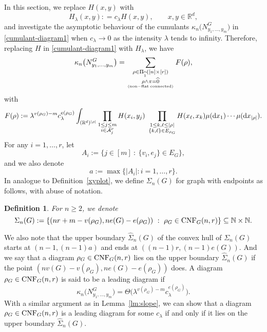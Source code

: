 \documentclass[12pt]{article}
\newcommand{\R}{\mathbb{R}}
\newcommand{\inte}{\mathbb{N}}
\newtheorem{definition}[prop]{Definition}
\def\real{{\mathord{\mathbb R}}}
\numberwithin{equation}{section}
\begin{document}
 In this section, we replace $H(x,y)$ with
$$
H_\lambda (x,y) : = c_\lambda H(x,y),
\qquad x, y \in \real^d,
$$
and investigate the asymptotic behaviour of the cumulants
$\kappa_n\big(N_{y_1,\ldots , y_m}^G\big)$ in \eqref{cumulant-diagram1} when $c_\lambda\to0$ as the intensity $\lambda$ tends
to infinity. Therefore, replacing $H$ in \eqref{cumulant-diagram1} with $H_\lambda$, we have
\begin{equation}\label{cumulant-diagram2}
  \kappa_n\big(N_{y_1,\ldots , y_m}^G\big)=
        \sum_{\substack{\rho\in\Pi_{\widehat{1}} ([n]\times[r])
            \\\rho\wedge\pi=\widehat{0}} \atop {\rm (non-flat \ \! connected)}}F(\rho),
\end{equation}
with 
\begin{equation}\label{}
  F(\rho):=\lambda^{v(\rho_G)-m}c_\lambda^{e(\rho_G)}
  \int_{(\R^d)^{|\rho|}}\prod_{
    \substack{%
    1 \leq j \leq m
      \\
    i\in {\cal A}^\rho_j}}  H(x_i,y_j)
  \ \prod_{\substack{
      1\leq k , \ell \le|\rho|
      \\
      \{ k , \ell \}\in E_{\rho_G} }}H(x_\ell,x_k)\mu ( \mathrm{d}x_1)
  \cdots \mu ( \mathrm{d}x_{|\rho|} ).
\end{equation}
For any $i=1, \ldots ,r$, let 
\begin{equation}\label{neighborhood1}
  A_i :=\{j\in [m] \ : \ \{v_i,e_j\}\in E_G\},
\end{equation}
and we also denote 
\begin{equation}
  a:=\max\{|A_i|:i=1,\dots,r\}.
\end{equation}
In analogue to Definition~\ref{xyplot}, we define $\Sigma_n(G)$ for graph with endpoints as follows, with abuse of notation. 
\begin{definition}\label{xyplot2}
  For $n\ge2$, we denote 
  \begin{equation*}
        \Sigma_n(G):=\{(nr+m-v(\rho_G),ne(G)-e(\rho_G)) \ : \ \rho_G\in
            {\rm CNF}_G(n,r)
            \} \subseteq \inte\times \inte.
    \end{equation*}
\end{definition}
We also note that the upper boundary $\widehat{\Sigma}_n(G)$ of the convex hull of $\Sigma_n(G)$ starts at $(n-1,(n-1)a)$ and ends at $((n-1)r,(n-1)e(G))$. And we say that a diagram $\rho_G\in {\rm CNF}_G(n,r)$ lies on the upper boundary $\widehat{\Sigma}_n(G)$ if the point $(nv(G)-v(\rho_G),ne(G)-e(\rho_G))$ does. A diagram $\rho_G\in{\rm CNF}_G(n,r)$ is said to be a leading diagram if 
$$\kappa_n\big(N_{y_1,\ldots , y_m}^G\big)=\Theta\big(\lambda^{v(\rho_G)-m}c_\lambda^{e(\rho_G)}\big).$$
With a similar argument as in Lemma~\ref{lm:slope}, we can show that a diagram $\rho_G\in{\rm CNF}_G(n,r)$ is a leading diagram for some $c_\lambda$ if and only if it lies on the upper boundary $\widehat{\Sigma}_n(G)$. 
\end{document}
